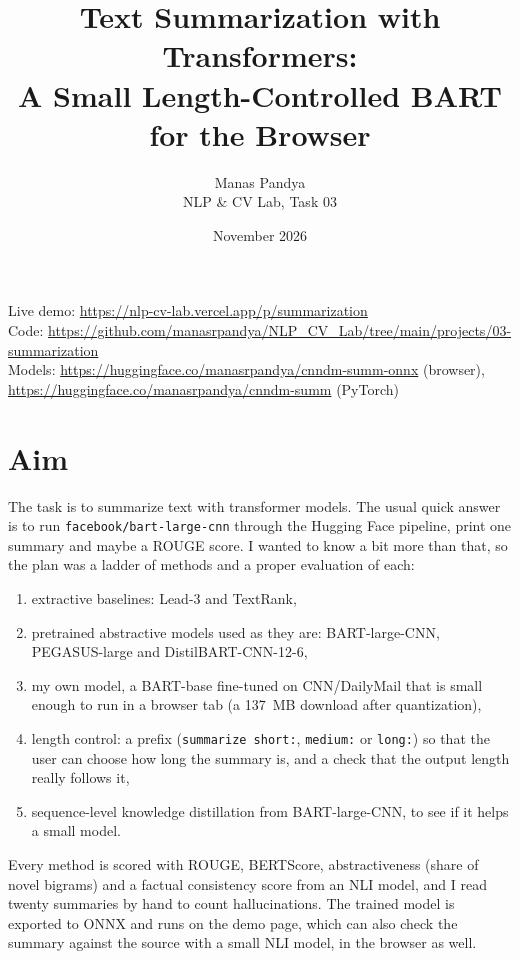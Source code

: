 \documentclass[11pt,a4paper]{article}
\title{Text Summarization with Transformers:\\A Small Length-Controlled BART for the Browser}
\author{Manas Pandya\\[0.2em]\small NLP \& CV Lab, Task 03}
\date{November 2026}
\begin{document}
\maketitle

\begin{center}
\small
Live demo: \url{https://nlp-cv-lab.vercel.app/p/summarization}\\
Code: \url{https://github.com/manasrpandya/NLP_CV_Lab/tree/main/projects/03-summarization}\\
Models: \url{https://huggingface.co/manasrpandya/cnndm-summ-onnx} (browser),
\url{https://huggingface.co/manasrpandya/cnndm-summ} (PyTorch)
\end{center}

\section{Aim}

The task is to summarize text with transformer models. The usual quick answer is to run
\texttt{facebook/bart-large-cnn} through the Hugging Face pipeline, print one summary and maybe a ROUGE
score. I wanted to know a bit more than that, so the plan was a ladder of methods and a proper evaluation
of each:

\begin{enumerate}
\itemsep0em
\item[(a)] extractive baselines: Lead-3 and TextRank,
\item[(b)] pretrained abstractive models used as they are: BART-large-CNN, PEGASUS-large and
DistilBART-CNN-12-6,
\item[(c)] my own model, a BART-base fine-tuned on CNN/DailyMail that is small enough to run in a browser
tab (a 137~MB download after quantization),
\item[(d)] length control: a prefix (\texttt{summarize short:}, \texttt{medium:} or \texttt{long:}) so that
the user can choose how long the summary is, and a check that the output length really follows it,
\item[(e)] sequence-level knowledge distillation from BART-large-CNN, to see if it helps a small model.
\end{enumerate}

Every method is scored with ROUGE, BERTScore, abstractiveness (share of novel bigrams) and a factual
consistency score from an NLI model, and I read twenty summaries by hand to count hallucinations. The
trained model is exported to ONNX and runs on the demo page, which can also check the summary against the
source with a small NLI model, in the browser as well.
\end{document}
